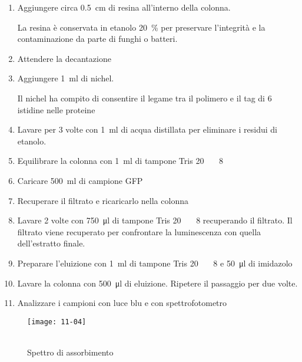 \begin{enumerate}
	\item Aggiungere circa \qty{0.5}{\cm} di resina all’interno della colonna.
	      \begin{Note}
		      La resina è conservata in etanolo \qty{20}{\percent} per preservare l'integrità e la contaminazione da parte di funghi o batteri.
	      \end{Note}
	\item Attendere la decantazione
	\item Aggiungere \qty{1}{\ml} di nichel.
	      \begin{Note}
		      Il nichel ha compito di consentire il legame tra il polimero e il tag di 6 istidine nelle proteine
	      \end{Note}
	\item Lavare per 3 volte con \qty{1}{\ml} di acqua distillata per eliminare i residui di etanolo.
	\item Equilibrare la colonna con \qty{1}{ml} di tampone Tris \qty{20}{\milli\Molar} \pH\ \num{8}
	\item Caricare \qty{500}{\ml} di campione GFP
	\item Recuperare il filtrato e ricaricarlo nella colonna
	\item Lavare 2 volte con \qty{750}{\micro\litre} di tampone Tris \qty{20}{\milli\Molar} \pH\ \num{8} recuperando il filtrato. Il filtrato viene recuperato per confrontare la luminescenza con quella dell’estratto finale.
	\item Preparare l’eluizione con \qty{1}{\ml} di tampone Tris \qty{20}{\milli\Molar} \pH\ \num{8} e \qty{50}{\micro\litre} di imidazolo
	\item Lavare la colonna con \qty{500}{\micro\litre} di eluizione. Ripetere il passaggio per due volte.
	\item Analizzare i campioni con luce blu e con spettrofotometro
\end{enumerate}


\begin{figure}[H]
	\centering
	\parbox{.75\textwidth}{
		\begin{riquadro}
			\strut\vspace*{-\baselineskip}\newline
			\texttt{[image: 11-04]}
			\caption{\\Spettro di assorbimento}\label{img:11-04}
		\end{riquadro}
	}
\end{figure}